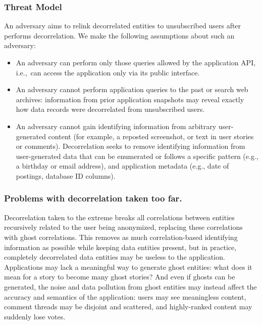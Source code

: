 \subsubsection{Threat Model} 
An adversary aims to relink decorrelated entities to unsubscribed users after \sys{}
performs decorrelation. We make the following assumptions about such an adversary: 
\begin{itemize}
    \item An adversary can perform only those queries allowed by the application API, 
i.e.,\ can access the application only via its public interface. 

    \item An adversary cannot perform application queries to the past or search web archives:
    information from prior application snapshots may reveal 
    exactly how data records were decorrelated from unsubscribed users. 

    \item An adversary cannot gain identifying information from arbitrary user-generated content (for
        example, a reposted screenshot, or text in user stories or comments). Decorrelation seeks to
        remove identifying information from user-generated data that can be enumerated or follows a
        specific pattern (e.g., a birthday or email address), and application metadata (e.g., date
        of postings, database ID columns).
\end{itemize}

\subsubsection{Problems with decorrelation taken too far.}
Decorrelation taken to the extreme breaks all correlations between entities recursively related to
the user being anonymized, replacing these correlations with ghost correlations.  This removes as
much correlation-based identifying information as possible while keeping data entities present, but
in practice, completely decorrelated data entities may be useless to the application.  Applications
may lack a meaningful way to generate ghost entities: what does it mean for a story to become many
ghost stories?  And even if ghosts can be generated, the noise and data pollution from ghost
entities may instead affect the accuracy and semantics of the application: users may see meaningless
content, comment threads may be disjoint and scattered, and highly-ranked content may suddenly lose
votes. 

